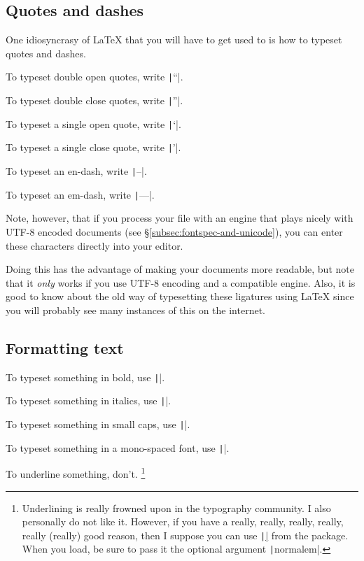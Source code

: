 \subsection{Quotes and dashes}
\label{subsec:quotes-and-dashes}

One idiosyncrasy of \LaTeX{} that you will have to get used to is how to typeset quotes and dashes.

To typeset double open quotes, write \texttt|``|.

To typeset double close quotes, write \texttt|''|.

To typeset a single open quote, write \texttt|`|.

To typeset a single close quote, write \texttt|'|.

To typeset an en-dash, write \texttt|--|.

To typeset an em-dash, write \texttt|---|.

Note, however, that if you process your file with an engine that plays nicely with UTF-8 encoded documents (see \S\ref{subsec:fontspec-and-unicode}), you can enter these characters directly into your editor.

Doing this has the advantage of making your documents more readable, but note that it \emph{only} works if you use UTF-8 encoding and a compatible engine.
Also, it is good to know about the old way of typesetting these ligatures using \LaTeX{} since you will probably see many instances of this on the internet.

\subsection{Formatting text}
\label{subsec:formatting-text}

To typeset something in bold, use \texttt|\textbf{}|.

To typeset something in italics, use \texttt|\textit{}|.

To typeset something in small caps, use \texttt|\textsc{}|.

To typeset something in a mono-spaced font, use \texttt|\texttt{}|.

To underline something, don't.%
\footnote{%
Underlining is really frowned upon in the typography community.
I also personally do not like it.
However, if you have a really, really, really, really, really (really) good reason, then I suppose you can use \texttt|\uline| from the  package.
When you load,  be sure to pass it the optional argument \texttt|normalem|.%
}

